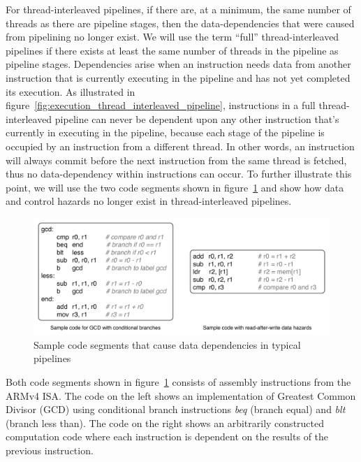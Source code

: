 For thread-interleaved pipelines, if there are, at a minimum, the same number of threads as there are pipeline stages, then the data-dependencies that were caused from pipelining no longer exist. 
We will use the term ``full'' thread-interleaved pipelines if there exists at least the same number of threads in the pipeline as pipeline stages.  
Dependencies arise when an instruction needs data from another instruction that is currently executing in the pipeline and has not yet completed its execution.
As illustrated in figure~\ref{fig:execution_thread_interleaved_pipeline}, instructions in a full thread-interleaved pipeline can never be dependent upon any other instruction that's currently in executing in the pipeline, because each stage of the pipeline is occupied by an instruction from a different thread.
In other words, an instruction will always commit before the next instruction from the same thread is fetched, thus no data-dependency within instructions can occur. 
To further illustrate this point, we will use the two code segments shown in figure~\ref{fig:sample_code_for_pipeline_hazards} and show how data and control hazards no longer exist in thread-interleaved pipelines. 
\begin{figure}
  \begin{center}
    \includegraphics[scale=.6]{figs/sample_code_for_pipeline_hazards}
  \end{center}
  \vspace{-20pt}
  \caption{Sample code segments that cause data dependencies in typical pipelines}
  \label{fig:sample_code_for_pipeline_hazards}
\end{figure}
Both code segments shown in figure~\ref{fig:sample_code_for_pipeline_hazards} consists of assembly instructions from the ARMv4 ISA.
The code on the left shows an implementation of Greatest Common Divisor (GCD) using conditional branch instructions \emph{beq} (branch equal) and \emph{blt} (branch less than). 
The code on the right shows an arbitrarily constructed computation code where each instruction is dependent on the results of the previous instruction. 

